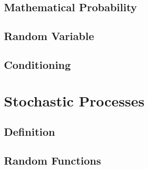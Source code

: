 \documentclass{article}
\begin{document}
\subsection{Mathematical Probability}

\subsection{Random Variable}

\subsection{Conditioning}

\section{Stochastic Processes}

\subsection{Definition}

\subsection{Random Functions}
\end{document}
